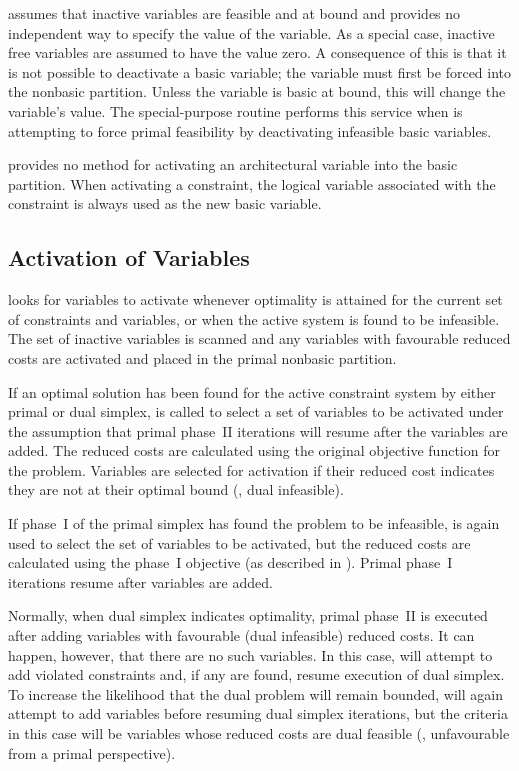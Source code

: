 \dylp assumes that inactive variables are feasible and at bound and provides
no independent way to specify the value of the variable.
As a special case, inactive free variables are assumed to have the value zero.
A consequence of this is that it is not possible to deactivate a basic
variable;
the variable must first be forced into the nonbasic partition.
Unless the variable is basic at bound, this will change the variable's value.
The special-purpose routine  performs this service
when \dylp is attempting to force primal feasibility by deactivating infeasible
basic variables.

\dylp provides no method for activating an architectural variable into the
basic partition.
When activating a constraint, the logical variable associated with the
constraint is always used as the new basic variable.

\subsection{Activation of Variables}
\label{sec:VariableActivation}

\dylp looks for variables to activate whenever optimality
is attained for the current set of constraints and variables, or when
the active system is found to be infeasible.
The set of inactive variables is scanned
and any variables with favourable
reduced costs are activated and placed in the primal nonbasic partition.

If an optimal solution has been found for the active constraint system
by either primal or dual simplex,  is called
to select a set of variables to be activated under the assumption that
primal phase~II iterations will resume after the variables are added.
The reduced costs are calculated using the original objective function
for the problem.
Variables are selected for activation if their reduced cost indicates they
are not at their optimal bound (\ie, dual infeasible).

If phase~I of the primal simplex has found the problem to be infeasible,
 is again used to select the set of variables to be
activated, but the reduced costs are calculated using the phase~I objective
(as described in ).
Primal phase~I iterations resume after variables are added.

Normally, when dual simplex indicates optimality, primal phase~II is executed
after adding variables with favourable (dual infeasible) reduced costs.
It can happen, however, that there are no such variables.
In this case, \dylp will attempt to add violated constraints and, if any are
found, resume execution of dual simplex.
To increase the likelihood that the dual problem will remain bounded,
\dylp will again attempt to add variables before resuming dual simplex
iterations, but the criteria in this case will be variables whose
reduced costs are dual feasible (\ie, unfavourable from a primal perspective).


